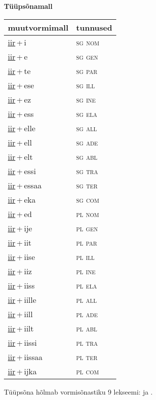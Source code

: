
\vspace{1.8em}
\begin{minipage}{\textwidth}
\textbf{Tüüpsõnamall \,}\\

\begin{sideways}
\begin{tabular}{l l}
muutvormimall & tunnused \\
\hline
\underline{iir}\,+\,i & \textsc{ sg nom } \\
\underline{iir}\,+\,e & \textsc{ sg gen } \\
\underline{iir}\,+\,te & \textsc{ sg par } \\
\underline{iir}\,+\,ese & \textsc{ sg ill } \\
\underline{iir}\,+\,ez & \textsc{ sg ine } \\
\underline{iir}\,+\,ess & \textsc{ sg ela } \\
\underline{iir}\,+\,elle & \textsc{ sg all } \\
\underline{iir}\,+\,ell & \textsc{ sg ade } \\
\underline{iir}\,+\,elt & \textsc{ sg abl } \\
\underline{iir}\,+\,essi & \textsc{ sg tra } \\
\underline{iir}\,+\,essaa & \textsc{ sg ter } \\
\underline{iir}\,+\,eka & \textsc{ sg com } \\
\underline{iir}\,+\,ed & \textsc{ pl nom } \\
\underline{iir}\,+\,ije & \textsc{ pl gen } \\
\underline{iir}\,+\,iit & \textsc{ pl par } \\
\underline{iir}\,+\,iise & \textsc{ pl ill } \\
\underline{iir}\,+\,iiz & \textsc{ pl ine } \\
\underline{iir}\,+\,iiss & \textsc{ pl ela } \\
\underline{iir}\,+\,iille & \textsc{ pl all } \\
\underline{iir}\,+\,iill & \textsc{ pl ade } \\
\underline{iir}\,+\,iilt & \textsc{ pl abl } \\
\underline{iir}\,+\,iissi & \textsc{ pl tra } \\
\underline{iir}\,+\,iissaa & \textsc{ pl ter } \\
\underline{iir}\,+\,ijka & \textsc{ pl com } \\
\end{tabular}
\end{sideways}
\label{tab:tüüpsõnamall-iiri}

\end{minipage}

 
\vspace{1em}
\noindent Tüüpsõna hõlmab vormisõnastiku 9 lekseemi:  ja .
